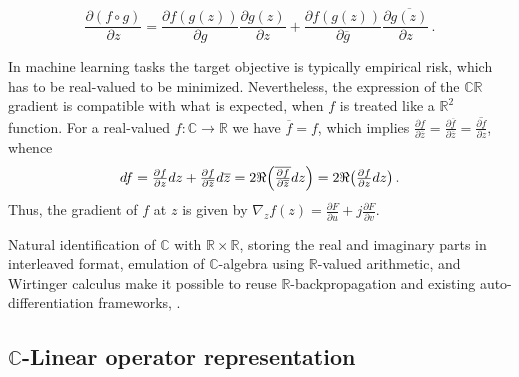 \documentclass[a4paper,10pt]{article}
\newcommand{\real}{\mathbb{R}}
\newcommand{\cplx}{\mathbb{C}}
\newcommand{\conj}[1]{\overline{#1}}
\begin{document}
$$
  \frac{\partial (f\circ g)}{\partial z}
    = \frac{\partial f(g(z))}{\partial g} \frac{\partial g(z)}{\partial z}
    + \frac{\partial f(g(z))}{\partial \conj{g}} \frac{\partial \conj{g(z)}}{\partial z}
  \,. $$

In machine learning tasks the target objective is typically empirical risk, which has to
be real-valued to be minimized. Nevertheless, the expression of the $\cplx\real$ gradient
is compatible with what is expected, when $f$ is treated like a $\real^2$ function. For a
real-valued $f\colon \cplx \to \real$ we have $\conj{f} = f$, which implies $
  \tfrac{\partial f}{\partial \conj{z}}
    = \tfrac{\partial \conj{f}}{\partial \conj{z}}
    = \conj{\tfrac{\partial f}{\partial z}}
$, whence
$$
df
  = \tfrac{\partial f}{\partial z} dz
    + \tfrac{\partial f}{\partial \conj{z}} d\conj{z}
  = 2 \Re \Bigl(
    \conj{\tfrac{\partial f}{\partial \conj{z}}} dz
  \Bigr)
  = 2 \Re \bigl(
    \tfrac{\partial f}{\partial z} dz
  \bigr)
  \,. $$
Thus, the gradient of $f$ at $z$ is given by $
  \nabla_z f(z)
    = \tfrac{\partial F}{\partial u}
      + j \tfrac{\partial F}{\partial v}
$.

Natural identification of $\cplx$ with $\real\times \real$, storing the real and imaginary
parts in interleaved format, emulation of $\cplx$-algebra using $\real$-valued arithmetic,
and Wirtinger calculus make it possible to reuse $\real$-backpropagation and existing
auto-differentiation frameworks, \citep{trabelsi_deep_2017}.


\subsection{$\cplx$-Linear operator representation} %
\label{sub:c-linear_operator_representation}
\end{document}
